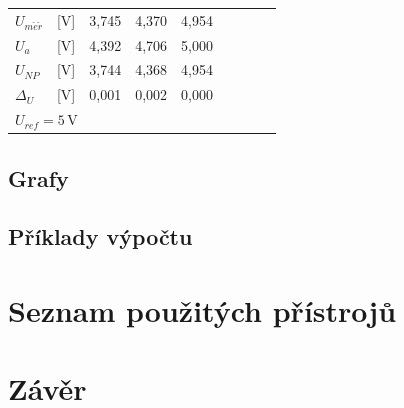 \documentclass[a4paper, czech]{article}
\begin{document}
\begin{table}[H]
\begin{tabular}{ll|ccccccc}
        \cmidrule(rl){1-5}
        $U_{m \check{e} \check{r}}$               & [V] & 3,745    & 4,370    & 4,954    \\
        $U_a$                 & [V]                     & 4,392    & 4,706    & 5,000    \\
        $U_{NP}$                & [V]                   & 3,744    & 4,368    & 4,954    \\
        $\Delta_U$                 & [V]                & 0,001    & 0,002    & 0,000    \\
        \cmidrule[0.8pt]{1-5}
        \multicolumn{9}{l}{$U_{ref} = 5$\,V}
    \end{tabular}
\end{table}

\subsection{Grafy}

\subsection{Příklady výpočtu}

\section{Seznam použitých přístrojů}

\section{Závěr}
\end{document}
